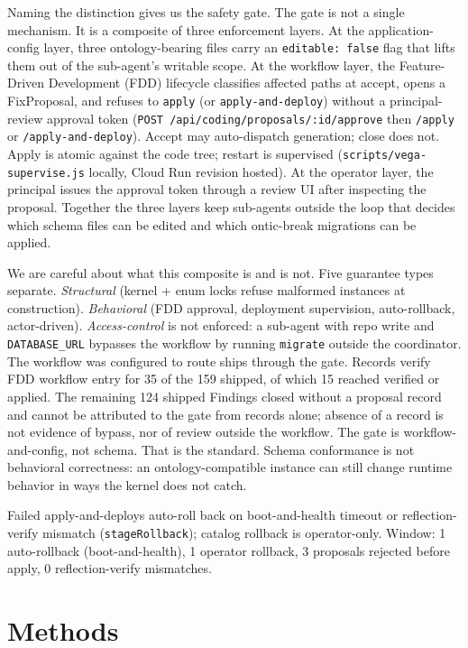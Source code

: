 \documentclass[conference,10pt]{IEEEtran}
\begin{document}
Naming the distinction gives us the safety gate. The gate is not a
single mechanism. It is a composite of three enforcement layers. At the
application-config layer, three ontology-bearing files carry an
\texttt{editable:\ false} flag that lifts them out of the sub-agent's writable
scope. At the workflow layer, the Feature-Driven Development (FDD) lifecycle \cite{palmer2002} classifies affected
paths at accept, opens a FixProposal, and refuses to \texttt{apply} (or
\texttt{apply-and-deploy}) without a principal-review approval token
(\texttt{POST\ /api/coding/proposals/:id/approve} then \texttt{/apply} or
\texttt{/apply-and-deploy}). Accept may auto-dispatch generation; close does
not. Apply is atomic against the code tree; restart is supervised
(\texttt{scripts/vega-supervise.js} locally, Cloud Run revision hosted). At the
operator layer, the principal issues the approval token through a review
UI after inspecting the proposal. Together the three layers keep
sub-agents outside the loop that decides which schema files can be
edited and which ontic-break migrations can be applied.

We are careful about what this composite is and is not. Five guarantee
types separate. \emph{Structural} (kernel + enum locks refuse malformed
instances at construction). \emph{Behavioral} (FDD approval, deployment
supervision, auto-rollback, actor-driven). \emph{Access-control} is not
enforced: a sub-agent with repo write and \texttt{DATABASE\_URL} bypasses the
workflow by running \texttt{migrate} outside the coordinator. The workflow was configured to route ships through the gate. Records
verify FDD workflow entry for 35 of the 159 shipped, of which 15
reached verified or applied. The remaining 124 shipped Findings closed
without a proposal record and cannot be attributed to the gate from
records alone; absence of a record is not evidence of bypass, nor of
review outside the workflow.
The gate is workflow-and-config, not schema. That is the standard.
Schema conformance is not behavioral correctness: an ontology-compatible
instance can still change runtime behavior in ways the kernel does not
catch.

Failed apply-and-deploys auto-roll back on boot-and-health timeout or
reflection-verify mismatch (\texttt{stageRollback}); catalog rollback is
operator-only. Window: 1 auto-rollback (boot-and-health), 1 operator rollback, 3
proposals rejected before apply, 0 reflection-verify mismatches.

\section{Methods}\label{sec:methods}
\end{document}
